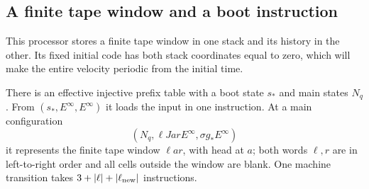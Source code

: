 \subsection{A finite tape window and a boot instruction}
\label{subsec:sb-window}
This processor stores a finite tape window in one stack and its history in the other.  Its fixed initial code has both stack coordinates equal to zero, which will make the entire velocity periodic from the initial time.

\begin{lemma}\label{lem:sb-window}
There is an effective injective prefix table with a boot state $s_*$ and main states $N_q$.  From $(s_*,E^\infty,E^\infty)$ it loads the input in one instruction.  At a main configuration
\[
 (N_q,\ell Ja rE^\infty,\sigma g_*E^\infty)
\]
it represents the finite tape window $\ell ar$, with head at $a$; both words $\ell,r$ are in left-to-right order and all cells outside the window are blank.  One machine transition takes $3+|\ell|+|\ell_{\rm new}|$ instructions.
\end{lemma}
